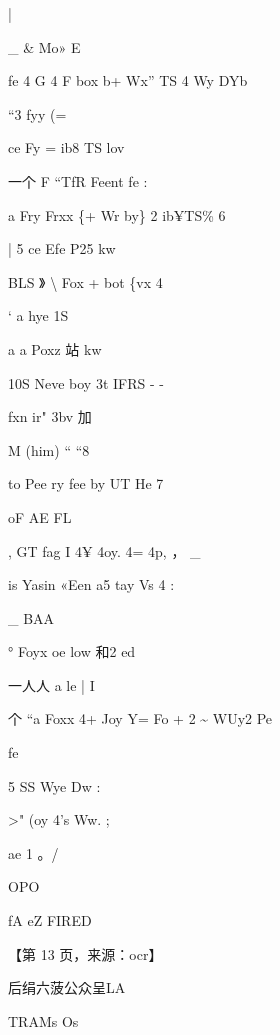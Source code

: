 \documentclass[UTF8,12pt,a4paper,openany]{ctexbook}
\begin{document}
\begin{enumerate}[label=\textbf{\arabic*.},leftmargin=2em]
                  |\par \_              \& Mo»                                          E\par fe  4       G         4       F        box b+ Wx” TS 4 Wy DYb\par “3                         fyy (=\par ce Fy = ib8 TS lov\par 一个            F   “TfR Feent fe                                         :\par a                Fry     Frxx \{+ Wr by\} 2  ib¥TS\% 6\par |                               5       ce Efe P25 kw\par BLS      》  \textbackslash{}  Fox + bot \{vx 4\par ‘   a hye 1S\par a              a Poxz 站 kw\par 10S                       Neve boy 3t IFRS -      -\par fxn ir" 3bv                         加\par M (him) “                                             “8\par to Pee ry fee by  UT He                    7\par oF           AE FL\par ,                           GT fag I 4¥ 4oy. 4= 4p,          ，             \_\par is          Yasin «Een a5 tay Vs  4               :\par \_ BAA\par °              Foyx oe low 和2                        ed\par 一人人          a le            |              I\par 个    “a    Foxx 4+ Joy Y= Fo + 2 \textasciitilde{} WUy2             Pe\par fe\par 5        SS Wye Dw                                          :\par >" (oy 4's Ww.                           ;\par ae 1 。/\par OPO\par fA eZ FIRED\par \par 【第 13 页，来源：ocr】\par 后绢六菠公众呈LA\par TRAMs Os 
\end{enumerate}
\end{document}
